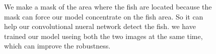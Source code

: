 \documentclass[conference]{IEEEtran}
\begin{document}
\begin{figure}[!ht]
\centering

  
  \caption{We make a mask of the area where the fish are located because the mask can force our model concentrate on the fish area. So it can help our convolutional nueral network detect the fish. we have trained our model useing both the two images at the same time, which can improve the robustness.}
   \label{fig:mosaic}

\end{figure}



\end{document}
